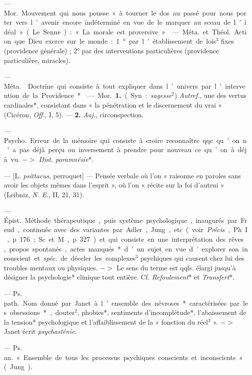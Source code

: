 \begin{itemize}[leftmargin=1cm, label=, itemsep=1pt]
 — \si{Mor.} Mouvement qui nous pousse « à tourner le dos au
passé pour nous porter vers l'avenir encore indéterminé en vue de le marquer
au sceau de l'idéal » (Le Senne) : « La morale est proversive ».

 — \si{Méta.} et \si{Théol.} Action que Dieu exerce sur le
monde : 1° par l'établissement de lois$^3$ fixes (providence générale) ; 2°
par des interventions particulières (providence particulière, miracles).

 — \si{Méta.}  Doctrine qui consiste à
tout expliquer dans l’univers par l'intervention de la Providence*.

 — \si{Mor.} {\bf 1.} (Syn. : {\it sagesse}$^2$) {\it Autref.},
une des vertus cardinales*, consistant dans « la pénétration et le
discernement du vrai » (Cicéron, {\it Off.}, I, 5). — {\bf 2.} {\it Auj.},
circonspection.

 — \si{Psycho.} Erreur de la mémoire qui consiste à croire
reconnaître qqc. qu’on n'a pas déjà perçu ou inversement à prendre pour
nouveau ce qu’on à déjà vu. $->$ {\it Dist.} {\it paramnésie}*.

 — [L. {\it psittacus}, perroquet] — Pensée verbale où l’on
« raisonne en paroles sans avoir les objets mêmes dans l’esprit », où l’on «
récite sur la foi d'autrui » (Leibniz, {\it N. E.}, II, 21, 31).

 — \si{Épist.} Méthode thérapeutique, puis système
psychologique, inaugurés par Freud, continués avec des variantes par Adler,
Jung, etc. (voir {\it Précis}, Ph. I, p. 176 ; Sc. et M., p. 327) et qui
consiste en une interprétation des rêves, propos spontanés, actes manqués*
d’un sujet en vue d’explorer son inconscient et {\it spéc.} de déceler les
complexes$^3$ psychiques qui causent chez lui des troubles mentaux ou
physiques. $->$ Le sens du terme est qqfs. élargi jusqu’à désigner la
psychologie* clinique tout entière. Cf. {\it Refoulement}* et
{\it Transfert}*.

 — \si{Ps. path.} Nom donné par Janet à l’ensemble des
névroses* caractérisées par les obsessions*, doutes$^2$, phobies*,
sentiments d’incomplétude*, l’abaissement de la tension* psychologique et
l’affaiblissement de la « fonction du réel$^3$ ». $->$ Janet écrit {\it
psychasténie}.

 — \si{Ps. an.} « Ensemble de tous les processus psychiques
conscients et inconscients » (Jung).


\end{itemize}
